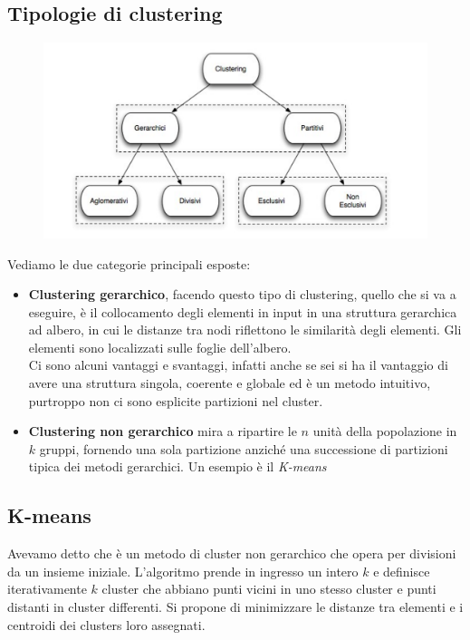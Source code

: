 \subsection{Tipologie di clustering}
\begin{figure}[H]
    \centering
    \includegraphics[scale = 0.3]{imm/cluster.PNG}
\end{figure}
Vediamo le due categorie principali esposte:
\begin{itemize}
    \item \textbf{Clustering gerarchico}, facendo questo tipo di clustering, quello che si va a eseguire, è il collocamento degli elementi in input in una struttura gerarchica ad albero, in cui le distanze tra nodi riflettono le similarità degli elementi. Gli elementi sono localizzati sulle foglie dell’albero.\\
    Ci sono alcuni vantaggi e svantaggi, infatti anche se sei si ha il vantaggio di avere una struttura singola, coerente e globale ed è un metodo intuitivo, purtroppo non ci sono esplicite partizioni nel cluster.
    \item \textbf{Clustering non gerarchico} mira a ripartire le $n$ unità della popolazione in $k$ gruppi, fornendo una sola partizione anziché una successione di partizioni tipica dei metodi gerarchici. Un esempio è il \textit{K-means}
\end{itemize}

\subsection{K-means}
Avevamo detto che è un metodo di cluster non gerarchico che opera per divisioni da un insieme iniziale. L'algoritmo prende in ingresso un intero $k$ e definisce iterativamente $k$ cluster che abbiano punti vicini in uno stesso cluster e punti distanti in cluster differenti. Si propone di minimizzare le distanze tra elementi e i centroidi dei clusters loro assegnati.
